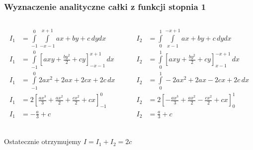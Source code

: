\documentclass[9pt]{beamer}
\begin{document}
\begin{frame}
\frametitle{Wyznaczenie analityczne całki z funkcji stopnia 1}
    \begin{columns}
        \begin{column}{0.5\textwidth}
            \begin{align*}
                I_1 &= \int\limits_{-1}^{0}\int\limits_{-x-1}^{x+1} ax+by+c \,dydx \\
                I_1 &= \int\limits_{-1}^{0}\left[axy + \frac{by^2}{2} + cy\right]_{-x-1}^{x+1} \,dx \\
                I_1 &= \int\limits_{-1}^{0} 2ax^2 + 2ax + 2cx + 2c \,dx \\
                I_1 &= 2\left[ \frac{ax^3}{3} + \frac{ax^2}{2} + \frac{cx^2}{2} + cx \right]_{-1}^{0} \\
                I_1 &= -\frac{a}{3} + c \\
            \end{align*}
        \end{column}
        \begin{column}{0.5\textwidth}
            \begin{align*}
                I_2 &= \int\limits_{0}^{1}\int\limits_{x-1}^{-x+1} ax+by+c \,dydx \\
                I_2 &= \int\limits_{0}^{1}\left[axy + \frac{by^2}{2} + cy\right]_{x-1}^{-x+1} \,dx \\
                I_2 &= \int\limits_{0}^{1} - 2ax^2 + 2ax - 2cx + 2c \,dx \\
                I_2 &= 2\left[ -\frac{ax^3}{3} + \frac{ax^2}{2} - \frac{cx^2}{2} + cx \right]_{0}^{1} \\
                I_2 &= \frac{a}{3} + c \\
            \end{align*}
        \end{column}
    \end{columns}

    \begin{center}
        Ostatecznie otrzymujemy $ I = I_1 + I_2 = 2c $
    \end{center}
\end{frame}
\end{document}
